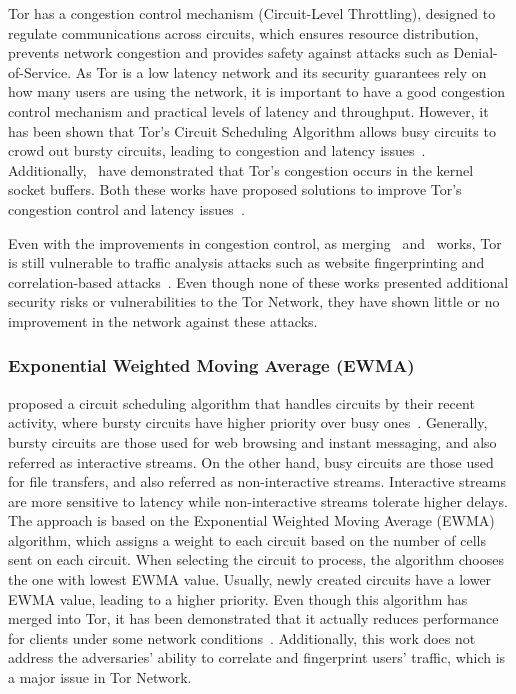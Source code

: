 Tor has a congestion control mechanism (Circuit-Level Throttling), designed to regulate communications across circuits, which ensures resource distribution, prevents network congestion and provides safety against attacks such as Denial-of-Service. As Tor is a low latency network and its security guarantees rely on how many users are using the network, it is important to have a good congestion control mechanism and practical levels of latency and throughput. However, it has been shown that Tor's Circuit Scheduling Algorithm allows busy circuits to crowd out bursty circuits, leading to congestion and latency issues~\cite{EWMA}. Additionally,~\citeauthor{KIST} have demonstrated that Tor's congestion occurs in the kernel socket buffers. Both these works have proposed solutions to improve Tor's congestion control and latency issues~\cite{KIST}.

Even with the improvements in congestion control, as merging~\citeauthor{EWMA} and~\citeauthor{KIST} works, Tor is still vulnerable to traffic analysis attacks such as website fingerprinting and correlation-based attacks~\cite*{KIST}. Even though none of these works presented additional security risks or vulnerabilities to the Tor Network, they have shown little or no improvement in the network against these attacks.

\subsubsection{Exponential Weighted Moving Average (EWMA)}\label{subsubsec:exponentialwma}

\citeauthor{EWMA} proposed a circuit scheduling algorithm that handles circuits by their recent activity, where bursty circuits have higher priority over busy ones~\cite{EWMA}. Generally, bursty circuits are those used for web browsing and instant messaging, and also referred as interactive streams. On the other hand, busy circuits are those used for file transfers, and also referred as non-interactive streams. Interactive streams are more sensitive to latency while non-interactive streams tolerate higher delays.
The approach is based on the Exponential Weighted Moving Average (EWMA) algorithm, which assigns a weight to each circuit based on the number of cells sent on each circuit. When selecting the circuit to process, the algorithm chooses the one with lowest EWMA value. Usually, newly created circuits have a lower EWMA value, leading to a higher priority. 
Even though this algorithm has merged into Tor, it has been demonstrated that it actually reduces performance for clients under some network conditions~\cite{shadow-ndss2012}. Additionally, this work does not address the adversaries' ability to correlate and fingerprint users' traffic, which is a major issue in Tor Network.

